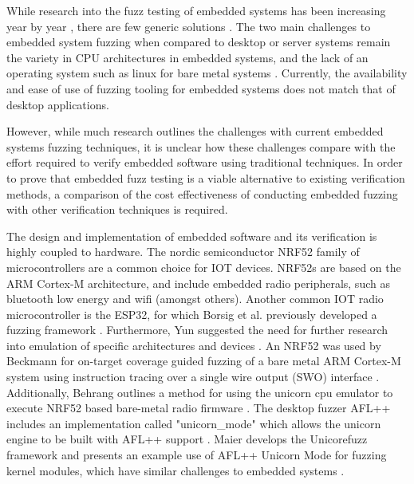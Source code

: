 \documentclass[../report.tex]{subfiles}
\begin{document}
While research into the fuzz testing of embedded systems has been increasing
year by year \citep{Yun_2022}, there are few generic solutions
\citep{Eisele_et_al_2022}. The two main challenges to embedded system fuzzing
when compared to desktop or server systems remain the variety in CPU
architectures in embedded systems, and the lack of an operating system such as
linux for bare metal systems \citep{Eisele_et_al_2022}. Currently, the
availability and ease of use of fuzzing tooling for embedded systems does not
match that of desktop applications.





However, while much research outlines the
challenges with current embedded systems fuzzing techniques, it is unclear how
these challenges compare with the effort required to verify embedded software
using traditional techniques. In order to prove that embedded fuzz testing is a
viable alternative to existing verification methods, a comparison of the cost
effectiveness of conducting embedded fuzzing with other verification techniques
is required.

The design and implementation of embedded software and its verification is
highly coupled to hardware. The nordic semiconductor NRF52 family of
microcontrollers are a common choice for IOT devices. NRF52s are based on the
ARM Cortex-M architecture, and include embedded radio peripherals, such as
bluetooth low energy and wifi (amongst others). Another common IOT radio
microcontroller is the ESP32, for which Borsig et al. previously developed a
fuzzing framework \citep{Borsig_2020}. Furthermore, Yun suggested the need for
further research into emulation of specific architectures and devices
\citep{Yun_2022}. An NRF52 was used by Beckmann for on-target coverage guided
fuzzing of a bare metal ARM Cortex-M system using instruction tracing over a
single wire output (SWO) interface \citep{Beckmann_2023}. Additionally, Behrang
outlines a method for using the unicorn cpu emulator to execute NRF52 based
bare-metal radio firmware \citep{Behrang_2023}. The desktop fuzzer AFL++
includes an implementation called "unicorn\_mode" which allows the unicorn
engine to be built with AFL++ support \citep{UnicornMode}. Maier develops the
Unicorefuzz framework and presents an example use of AFL++ Unicorn Mode for
fuzzing kernel modules, which have similar challenges to embedded systems
\citep{Maier_2019}.
\end{document}
